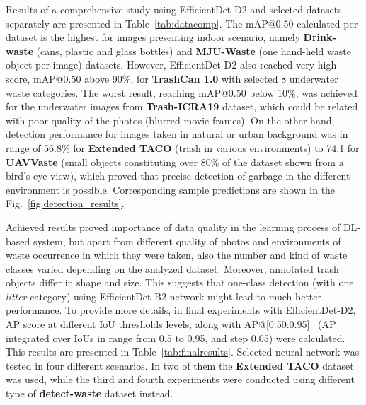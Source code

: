 \documentclass{article}
\begin{document}
\newpage
Results of a comprehensive study using EfficientDet-D2 and selected datasets separately are presented in Table~\ref{tab:datacomp}. The mAP@0.50 calculated per dataset is the highest for images presenting indoor scenario, namely \textbf{Drink-waste} (cans, plastic and glass bottles) and \textbf{MJU-Waste} (one hand-held waste object per image) datasets. However, EfficientDet-D2 also reached very high score, mAP@0.50 above 90\%, for \textbf{TrashCan 1.0} with selected 8 underwater waste categories. The worst result, reaching mAP@0.50 below 10\%, was achieved for the underwater images from \textbf{Trash-ICRA19} dataset, which could be related with poor quality of the photos (blurred movie frames). On the other hand, detection performance for images taken in natural or urban background was in range of 56.8\% for \textbf{Extended TACO} (trash in various environments) to 74.1 for \textbf{UAVVaste} (small objects constituting over 80\% of the dataset shown from a bird's eye view), which proved that precise detection of garbage in the different environment is possible. Corresponding sample predictions are shown in the Fig.~\ref{fig.detection_results}.

Achieved results proved importance of data quality in the learning process of DL-based system, but apart from different quality of photos and environments of waste occurrence in which they were taken, also the number and kind of waste classes varied depending on the analyzed dataset. Moreover, annotated trash objects differ in shape and size. This suggests that one-class detection (with one \textit{litter} category) using EfficientDet-B2 network might lead to much better performance. To provide more details, in final experiments with EfficientDet-D2, AP score at different IoU thresholds levels, along with AP@[0.50:0.95]~\cite{bib:COCO2014} (AP integrated over IoUs in range from 0.5 to 0.95, and step 0.05) were calculated. This results are presented in Table~\ref{tab:finalresults}. Selected neural network was tested in four different scenarios. In two of them the \textbf{Extended TACO} dataset was used, while the third and fourth experiments were conducted using different type of \textbf{detect-waste} dataset instead. 
\end{document}
